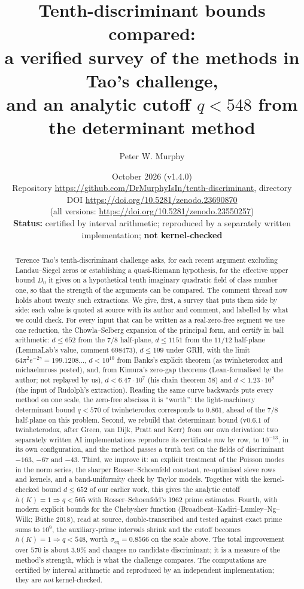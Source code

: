 \documentclass[11pt]{article}
\title{Tenth-discriminant bounds compared:\\ a verified survey of the methods in Tao's challenge,\\ and an analytic cutoff $q < 548$ from the determinant method}
\author{Peter W. Murphy}
\date{October 2026 (v1.4.0)\\[2pt] \small Repository \url{https://github.com/DrMurphyIsIn/tenth-discriminant}, directory \lean{comparison/}\\ \small DOI \url{https://doi.org/10.5281/zenodo.23690870}\\ \small (all versions: \url{https://doi.org/10.5281/zenodo.23550257})\\ \small \textbf{Status:} certified by interval arithmetic; reproduced by a separately written implementation; \textbf{not kernel-checked}}
\theoremstyle{definition}
\begin{document}
\maketitle

\begin{abstract}
Terence Tao's tenth-discriminant challenge asks, for each recent argument excluding Landau--Siegel zeros or establishing a quasi-Riemann hypothesis, for the effective upper bound $D_0$ it gives on a hypothetical tenth imaginary quadratic field of class number one, so that the strength of the arguments can be compared. The comment thread now holds about twenty such extractions. We give, first, a survey that puts them side by side: each value is quoted at source with its author and comment, and labelled by what we could check. For every input that can be written as a real-zero-free segment we use one reduction, the Chowla--Selberg expansion of the principal form, and certify in ball arithmetic: $d \le 652$ from the $7/8$ half-plane, $d \le 1151$ from the $11/12$ half-plane (LemmaLab's value, comment 698473), $d \le 199$ under GRH, with the limit $64\pi^2 e^{-2\gamma} = 199.1208\ldots$, $d < 10^{10}$ from Banks's explicit theorem (as twinheterodox and michaelmross posted), and, from Kimura's zero-gap theorems (Lean-formalised by the author; not replayed by us), $d < 6.47\cdot 10^7$ (his chain theorem 58) and $d < 1.23\cdot 10^8$ (the input of Rudolph's extraction). Reading the same curve backwards puts every method on one scale, the zero-free abscissa it is ``worth'': the light-machinery determinant bound $q<570$ of twinheterodox corresponds to $0.861$, ahead of the $7/8$ half-plane on this problem. Second, we rebuild that determinant bound (v0.6.1 of twinheterodox, after Green, van Dijk, Pratt and Kerr) from our own derivation: two separately written AI implementations reproduce its certificate row by row, to $10^{-13}$, in its own configuration, and the method passes a truth test on the fields of discriminant $-163$, $-67$ and $-43$. Third, we improve it: an explicit treatment of the Poisson modes in the norm series, the sharper Rosser--Schoenfeld constant, re-optimised sieve rows and kernels, and a band-uniformity check by Taylor models. Together with the kernel-checked bound $d \le 652$ of our earlier work, this gives the analytic cutoff $h(K) = 1 \Rightarrow q < 565$ with Rosser--Schoenfeld's 1962 prime estimates. Fourth, with modern explicit bounds for the Chebyshev function (Broadbent--Kadiri--Lumley--Ng--Wilk; B\"uthe 2018), read at source, double-transcribed and tested against exact prime sums to $10^9$, the auxiliary-prime intervals shrink and the cutoff becomes $h(K) = 1 \Rightarrow q < 548$, worth $\sigma_{\mathrm{eq}} = 0.8566$ on the scale above. The total improvement over $570$ is about $3.9\%$ and changes no candidate discriminant; it is a measure of the method's strength, which is what the challenge compares. The computations are certified by interval arithmetic and reproduced by an independent implementation; they are \emph{not} kernel-checked.
\end{abstract}
\end{document}
